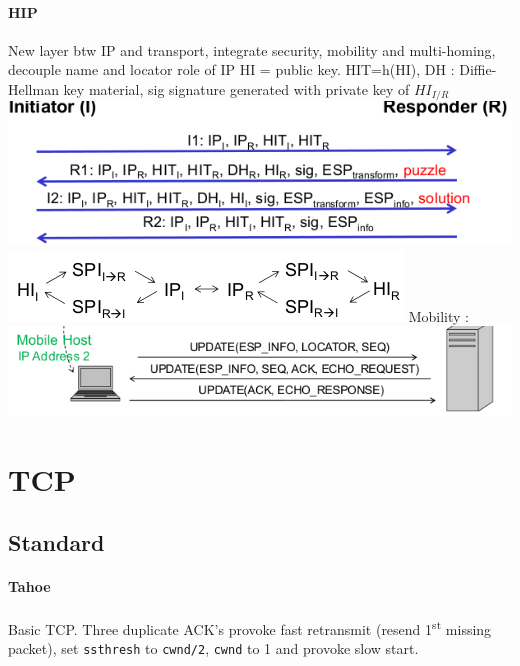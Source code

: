 \documentclass[6pt]{scrartcl}
\begin{document}
\begin{multicols}{4}
\paragraph{HIP} New layer btw IP and transport, integrate security, mobility and multi-homing, decouple name and locator role of IP HI = public key. HIT=h(HI), DH : Diffie-Hellman key material, sig signature generated with private key of $HI_{I/R}$\\
\includegraphics[width=\columnwidth]{E4}
\includegraphics[width=\columnwidth]{E5}
Mobility :\\
\includegraphics[width=\columnwidth]{E6}









\section{TCP}

\subsection{Standard}

\paragraph{Tahoe} Basic TCP. Three duplicate ACK's provoke fast retransmit (resend 1\textsuperscript{st} missing packet), set \texttt{ssthresh} to \texttt{cwnd/2}, \texttt{cwnd} to 1 and provoke slow start.


\end{multicols}
\end{document}
